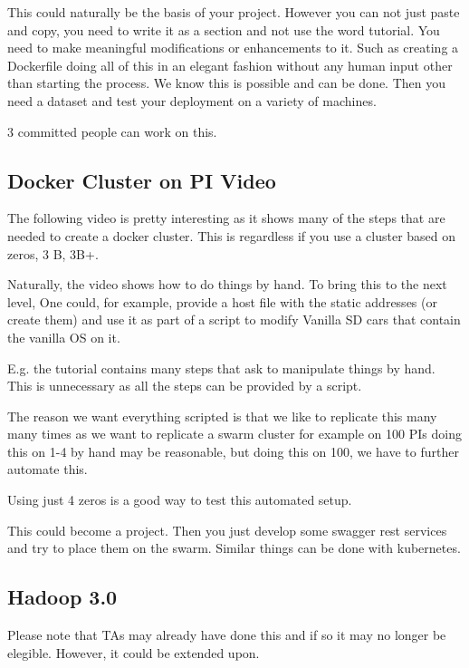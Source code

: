 This could naturally be the basis of your project. However you can not
just paste and copy, you need to write it as a section and not use the
word tutorial. You need to make meaningful modifications or
enhancements to it. Such as creating a Dockerfile doing all of this in
an elegant fashion without any human input other than starting the
process. We know this is possible and can be done. Then you need a
dataset and test your deployment on a variety of machines.
 
3 committed people can work on this.


\subsection{Docker Cluster on PI Video}

The following video is pretty interesting as it shows many of the
steps that are needed to create a docker cluster. This is regardless
if you use a cluster based on zeros, 3 B, 3B+.


Naturally, the video shows how to do things by hand. To bring this to
the next level, One could, for example, provide a host file with the
static addresses (or create them) and use it as part of a script to
modify Vanilla SD cars that contain the vanilla OS on it.

E.g. the tutorial contains many steps that ask to manipulate things by
hand. This is unnecessary as all the steps can be provided by a
script. 

The reason we want everything scripted is that we like to replicate
this many many times as we want to replicate a swarm cluster for
example on 100 PIs doing this on 1-4 by hand may be reasonable, but
doing this on 100, we have to further automate this.

Using just 4 zeros is a good way to test this automated setup.  

This could become a project. Then you just develop some swagger rest
services and try to place them on the swarm. Similar things can be
done with kubernetes.

\subsection{Hadoop 3.0}

\begin{IU}
Please note that TAs may already have done this and if so it may no
longer be elegible. However, it could be extended upon.
\end{IU}

